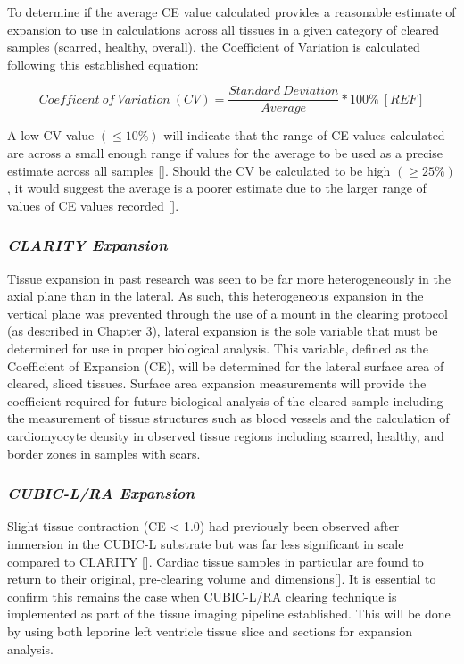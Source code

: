 To determine if the average CE value calculated provides a reasonable estimate of expansion to use in calculations across all tissues in a given category of cleared samples (scarred, healthy, overall), the Coefficient of Variation is calculated following this established equation:

\newline
\begin{equation}
Coefficent\ of\ Variation\ (CV) = \frac{Standard\ Deviation}{Average}*100\%\ [REF]
\end{equation}
\medskip

A low CV value $(\leq 10\%)$ will indicate that the range of CE values calculated are across a small enough range if values for the average to be used as a precise estimate across all samples []. Should the CV be calculated to be high $(\geq 25\%)$, it would suggest the average is a poorer estimate due to the larger range of values of CE values recorded [].

\subsubsection{\textit{CLARITY Expansion}} Tissue expansion in past research was seen to be far more heterogeneously in the axial plane than in the lateral. As such, this heterogeneous expansion in the vertical plane was prevented through the use of a mount in the clearing protocol (as described in Chapter 3), lateral expansion is the sole variable that must be determined for use in proper biological analysis. This variable, defined as the Coefficient of Expansion (CE), will be determined for the lateral surface area of cleared, sliced tissues. Surface area expansion measurements will provide the coefficient required for future biological analysis of the cleared sample including the measurement of tissue structures such as blood vessels and the calculation of cardiomyocyte density in observed tissue regions including scarred, healthy, and border zones in samples with scars.

\subsubsection{\textit{CUBIC-L/RA Expansion}} Slight tissue contraction (CE < 1.0) had previously been observed after immersion in the CUBIC-L substrate but was far less significant in scale compared to CLARITY []. Cardiac tissue samples in particular are found to return to their original, pre-clearing volume and dimensions[]. It is essential to confirm this remains the case when CUBIC-L/RA clearing technique is implemented as part of the tissue imaging pipeline established. This will be done by using both leporine left ventricle tissue slice and sections for expansion analysis. 

